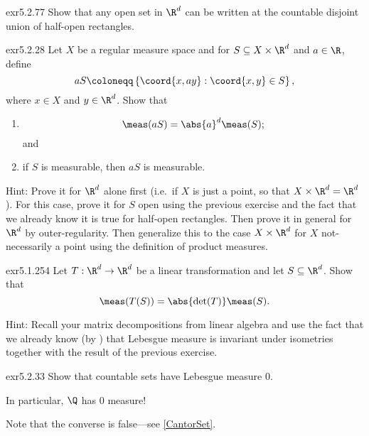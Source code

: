 \begin{exr}{}{exr5.2.77}
Show that any open set in $\R ^d$ can be written at the countable disjoint union of half-open rectangles.
\end{exr}
\begin{exr}{}{exr5.2.28}
Let $X$ be a regular measure space and for $S\subseteq X\times \R ^d$ and $a\in \R$, define
\begin{equation}
aS\coloneqq \left\{ \coord{x,ay}:\coord{x,y}\in S\right\} ,
\end{equation}
where $x\in X$ and $y\in \R ^d$.  Show that
\begin{enumerate}
\item
\begin{equation}
\meas (aS)=\abs{a}^d\meas (S);
\end{equation}
and
\item if $S$ is measurable, then $aS$ is measurable.
\end{enumerate}
\begin{rmk}
Hint:  Prove it for $\R ^d$ alone first (i.e.~if $X$ is just a point, so that $X\times \R ^d=\R ^d$).  For this case, prove it for $S$ open using the previous exercise and the fact that we already know it is true for half-open rectangles.  Then prove it in general for $\R ^d$ by outer-regularity.  Then generalize this to the case $X\times \R ^d$ for $X$ not-necessarily a point using the definition of product measures.
\end{rmk}
\end{exr}
\begin{exr}{}{exr5.1.254}
Let $T:\R ^d\rightarrow \R ^d$ be a linear transformation and let $S\subseteq \R ^d$.  Show that
\begin{equation}
\meas (T(S))=\abs{\det (T)}\meas (S).
\end{equation}
\begin{rmk}
Hint:  Recall your matrix decompositions from linear algebra and use the fact that we already know (by ) that Lebesgue measure is invariant under isometries together with the result of the previous exercise.
\end{rmk}
\end{exr}

\begin{exr}{}{exr5.2.33}
Show that countable sets have Lebesgue measure $0$.
\begin{rmk}
In particular, $\Q$ has $0$ measure!
\end{rmk}
\begin{rmk}
Note that the converse is false---see \cref{CantorSet}.
\end{rmk}
\end{exr}

